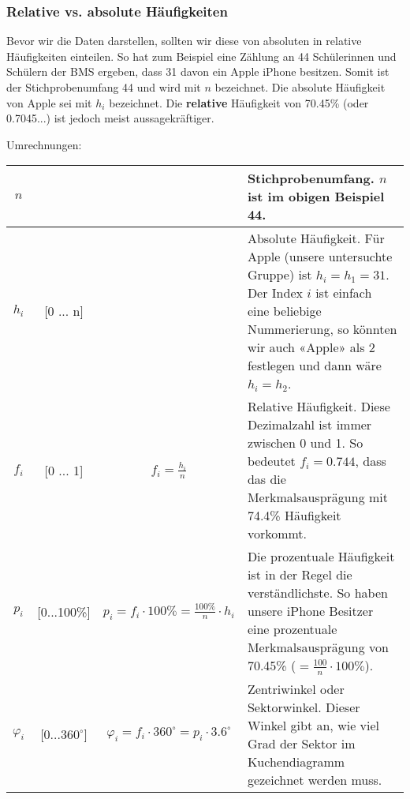 \subsubsection{Relative vs. absolute Häufigkeiten}
Bevor wir die Daten darstellen, sollten wir diese von absoluten in
relative Häufigkeiten einteilen. So hat zum Beispiel eine Zählung an
44 Schülerinnen und Schülern der BMS ergeben, dass 31 davon ein Apple
iPhone besitzen. Somit ist der Stichprobenumfang 44 und wird mit $n$
bezeichnet. Die absolute Häufigkeit von Apple sei mit $h_i$
bezeichnet. Die \textbf{relative} Häufigkeit von 70.45\% (oder 0.7045...) ist
jedoch meist aussagekräftiger.

Umrechnungen:

\begin{tabular}{|c|c|c|p{8cm}|}
  \hline
  $n$   &   &  &Stichprobenumfang. $n$ ist im obigen Beispiel 44.\\
  \hline
  $h_i$ & [0 ... n]  & & Absolute Häufigkeit. Für Apple (unsere untersuchte
  Gruppe) ist $h_i=h_1=31$. Der Index $i$ ist einfach eine beliebige
  Nummerierung, so könnten wir auch «Apple» als $2$ festlegen und dann
  wäre $h_i=h_2$.\\
  \hline
  $f_i$ & [0 ... 1] &$f_i = \frac{h_i}{n}$ & Relative
  Häufigkeit. Diese Dezimalzahl ist immer zwischen 0 und 1. So
  bedeutet $f_i=0.744$, dass das die Merkmalsausprägung mit 74.4\%
  Häufigkeit vorkommt.\\
  \hline
  $p_i$ & [0...100\%] & $p_i = f_i\cdot{}100\% =
  \frac{100\%}{n}\cdot{}h_i$ & Die prozentuale Häufigkeit ist in der
  Regel die verständlichste. So haben unsere iPhone Besitzer eine
  prozentuale Merkmalsausprägung von 70.45\%
  ($=\frac{100}{n}\cdot{}100\%$).\\
  \hline
  $\varphi_i$ & [0...$360^{\circ}$] & $\varphi_i = f_i\cdot{}360^\circ
  = p_i\cdot{}3.6^\circ$ &
  Zentriwinkel oder Sektorwinkel. Dieser Winkel gibt an, wie viel Grad
  der Sektor im Kuchendiagramm gezeichnet werden muss.\\
  \hline
\end{tabular}
\newpage



